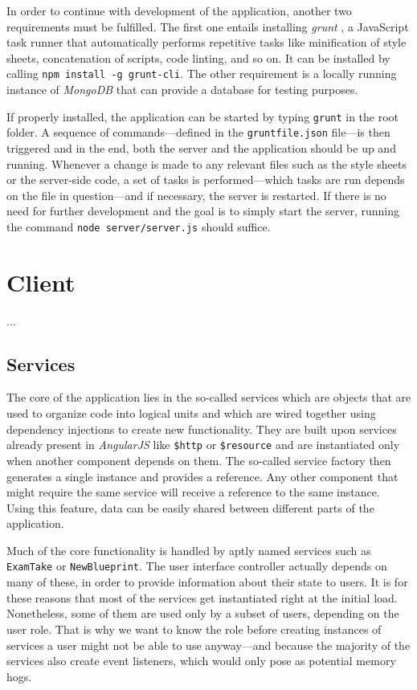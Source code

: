 \documentclass[thesis=M,english,hidelinks]{FITthesis}[2012/10/20]
\newcommand{\code}{\texttt}
\begin{document}
In order to continue with development of the application, another two requirements must be fulfilled. The first one entails installing \textit{grunt} \cite{grunt}, a JavaScript task runner that automatically performs repetitive tasks like minification of style sheets, concatenation of scripts, code linting, and so on. It can be installed by calling \code{npm install -g grunt-cli}. The other requirement is a locally running instance of \textit{MongoDB} that can provide a database for testing purposes.

If properly installed, the application can be started by typing \code{grunt} in the root folder. A sequence of commands---defined in the \code{gruntfile.json} file---is then triggered and in the end, both the server and the application should be up and running. Whenever a change is made to any relevant files such as the style sheets or the server-side code, a set of tasks is performed---which tasks are run depends on the file in question---and if necessary, the server is restarted. If there is no need for further development and the goal is to simply start the server, running the command \code{node server/server.js} should suffice.

\section{Client}

  ...

  \subsection{Services}

The core of the application lies in the so-called services which are objects that are used to organize code into logical units and which are wired together using dependency injections to create new functionality. They are built upon services already present in \textit{AngularJS} like \code{\$http} or \code{\$resource}  and are instantiated only when another component depends on them. The so-called service factory then generates a single instance and provides a reference. Any other component that might require the same service will receive a reference to the same instance. Using this feature, data can be easily shared between different parts of the application.

Much of the core functionality is handled by aptly named services such as \code{ExamTake} or \code{NewBlueprint}. The user interface controller actually depends on many of these, in order to provide information about their state to users. It is for these reasons that most of the services get instantiated right at the initial load. Nonetheless, some of them are used only by a subset of users, depending on the user role. That is why we want to know the role before creating instances of services a user might not be able to use anyway---and because the majority of the services also create event listeners, which would only pose as potential memory hogs.
\end{document}
